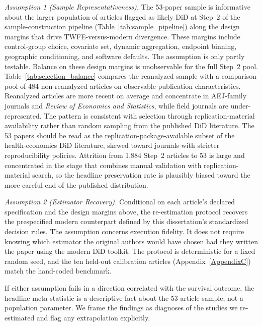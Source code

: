 \documentclass[11pt]{article}
\begin{document}
\textit{Assumption 1 (Sample Representativeness).} The 53-paper sample is informative about the larger population of articles flagged as likely DiD at Step~2 of the sample-construction pipeline (Table~\ref{tab:sample_pipeline}) along the design margins that drive TWFE-versus-modern divergence. These margins include control-group choice, covariate set, dynamic aggregation, endpoint binning, geographic conditioning, and software defaults. The assumption is only partly testable. Balance on these design margins is unobservable for the full Step~2 pool. Table~\ref{tab:selection_balance} compares the reanalyzed sample with a comparison pool of 484 non-reanalyzed articles on observable publication characteristics. Reanalyzed articles are more recent on average and concentrate in AEJ-family journals and \emph{Review of Economics and Statistics}, while field journals are under-represented. The pattern is consistent with selection through replication-material availability rather than random sampling from the published DiD literature. The 53 papers should be read as the replication-package-available subset of the health-economics DiD literature, skewed toward journals with stricter reproducibility policies. Attrition from 1,884 Step~2 articles to 53 is large and concentrated in the stage that combines manual validation with replication-material search, so the headline preservation rate is plausibly biased toward the more careful end of the published distribution.



\textit{Assumption 2 (Estimator Recovery).} Conditional on each article's declared specification and the design margins above, the re-estimation protocol recovers the prespecified modern counterpart defined by this dissertation's standardized decision rules. The assumption concerns execution fidelity. It does not require knowing which estimator the original authors would have chosen had they written the paper using the modern DiD toolkit. The protocol is deterministic for a fixed random seed, and the ten held-out calibration articles (Appendix~\ref{AppendixC}) match the hand-coded benchmark.

If either assumption fails in a direction correlated with the survival outcome, the headline meta-statistic is a descriptive fact about the 53-article sample, not a population parameter. We frame the findings as diagnoses of the studies we re-estimated and flag any extrapolation explicitly.
\end{document}
